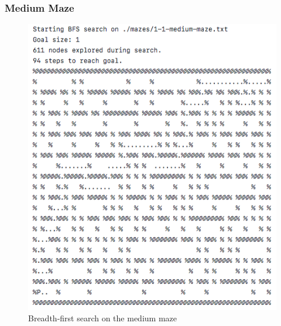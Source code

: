 \documentclass[titlepage]{article}
\begin{document}
\subsubsection{Medium Maze}
\begin{figure}[h!]
\includegraphics[width=\linewidth]{bfsmedium.png}
\caption{Breadth-first search on the medium maze}
\label{fig:BFSmedium}
\end{figure}

\newpage
\end{document}
